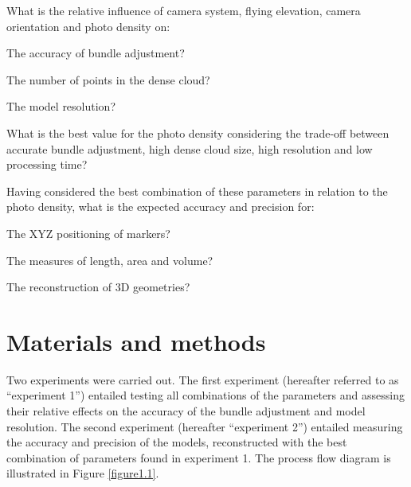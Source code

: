 
\begin{inparaenum}
  \item What is the relative influence of camera system, flying elevation, camera orientation and photo density on:
  \begin{inparaenum}
    \item The accuracy of bundle adjustment?
    \item The number of points in the dense cloud?
    \item The model resolution?
  \end{inparaenum}
  \item What is the best value for the photo density considering the trade-off between accurate bundle adjustment, high dense cloud size, high resolution and low processing time?
   \item Having considered the best combination of these parameters in relation to the photo density, what is the expected accuracy and precision for:
  \begin{inparaenum}
    \item The XYZ positioning of markers? 
    \item The measures of length, area and volume?
    \item The reconstruction of 3D geometries?
  \end{inparaenum}
\end{inparaenum}

\section{Materials and methods}\label{chapitre1_2}

Two experiments were carried out. The first experiment (hereafter referred to as “experiment 1”) entailed testing all combinations of the parameters and assessing their relative effects on the accuracy of the bundle adjustment and model resolution. The second experiment (hereafter “experiment 2”) entailed measuring the accuracy and precision of the models, reconstructed with the best combination of parameters found in experiment 1. The process flow diagram is illustrated in Figure \ref{figure1.1}.

